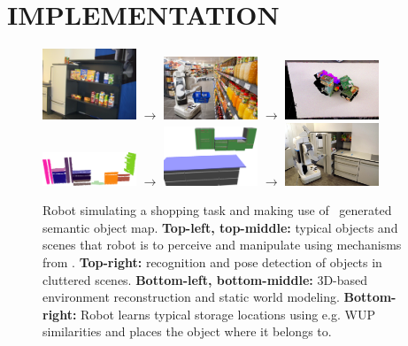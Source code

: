 \section{IMPLEMENTATION} %
\label{sec:implementation}
\begin{figure}[h!]
  \begin{center}
    \includegraphics[width=0.25\textwidth]
    {figures/storage_rack.JPG}
    {\large$\rightarrow$}
    \includegraphics[width=0.25\textwidth]
    {figures/pr2_edeka_basket_1.jpg}
    {\large$\rightarrow$}
    \includegraphics[width=0.25\textwidth]
    {figures/clutter-objects.png} \\
    \vspace{2ex}
    \includegraphics[width=0.25\textwidth]
    {figures/all_segmented.png}
    {\large$\rightarrow$}
    \includegraphics[width=0.25\textwidth]{figures/xml_map.png}
    {\large$\rightarrow$}
    \includegraphics[width=0.25\textwidth]
    {figures/pr2_highdrawer.jpg}
  \end{center}
  \caption{\small{Robot simulating a shopping task and making use of \ksem\ generated semantic object map. \textbf{Top-left, top-middle:} 
    typical objects and scenes that robot is to perceive and manipulate using mechanisms from \ksem. 
    \textbf{Top-right:} recognition and pose detection of objects in cluttered scenes. \textbf{Bottom-left, bottom-middle:} 
  3D-based environment reconstruction and static world modeling. \textbf{Bottom-right:} Robot learns typical storage locations
using e.g. WUP~\cite{wup} similarities and places the object where it belongs to.}}
  \label{fig:teaser}
\end{figure}
